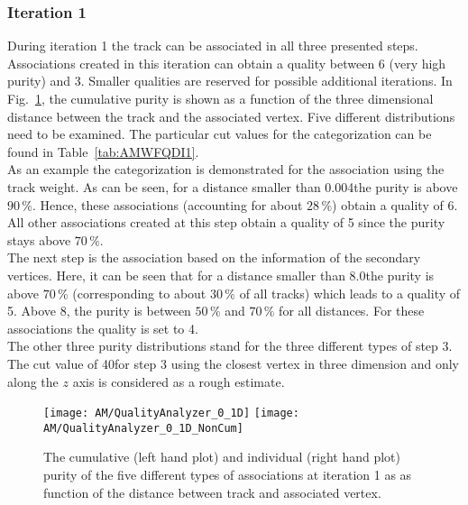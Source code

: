 

\subsubsection{Iteration 1}
During iteration 1 the track can be associated in all three presented steps. Associations created in this iteration can obtain a quality between 6 (very high purity) and 3. Smaller qualities are reserved for possible additional iterations. In Fig.~\ref{plot:AMWFQualityI1}, the cumulative purity is shown as a function of the three dimensional distance between the track and the associated vertex. Five different distributions need to be examined. The particular cut values for the categorization can be found in Table~\ref{tab:AMWFQDI1}. \\
As an example the categorization is demonstrated for the association using the track weight. As can be seen, for a distance smaller than 0.004\cm the purity is above $90\,\%$. Hence, these associations (accounting for about $28\,\%$) obtain a quality of 6. All other associations created at this step obtain a quality of 5 since the purity stays above $70\,\%$. \\
The next step is the association based on the information of the secondary vertices. Here, it can be seen that for a distance smaller than 8.0\cm the purity is above $70\,\%$ (corresponding to about $30\,\%$ of all tracks) which leads to a quality of 5. Above 8\cm{}, the purity is between $50\,\%$ and $70\,\%$ for all distances. For these associations the quality is set to 4. \\
The other three purity distributions stand for the three different types of step 3. The cut value of 40\cm for step 3 using the closest vertex in three dimension and only along the $z$ axis is considered as a rough estimate.

\begin{figure}[Ht]
    \centering
    \texttt{[image: AM/QualityAnalyzer\_0\_1D]}
    \texttt{[image: AM/QualityAnalyzer\_0\_1D\_NonCum]}
    \caption[Cumulative and normal purity of iteration 1 \vs{} distance to define quality]{The cumulative (left hand plot) and individual (right hand plot) purity of the five different types of associations at iteration 1 as as function of the distance between track and associated vertex.\label{plot:AMWFQualityI1}}
\end{figure}



